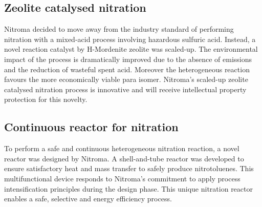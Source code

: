 \subsection{Zeolite catalysed nitration}

Nitroma decided to move away from the industry standard of performing nitration with a mixed-acid process involving hazardous sulfuric acid. Instead, a novel reaction catalyst by H-Mordenite zeolite was scaled-up. The environmental impact of the process is dramatically improved due to the absence of  emissions and the reduction of wasteful spent acid. Moreover the heterogeneous reaction favours the more economically viable para isomer. Nitroma's scaled-up zeolite catalysed nitration process is innovative and will receive intellectual property protection for this novelty. 

\subsection{Continuous reactor for nitration}

To perform a safe and continuous heterogeneous nitration reaction, a novel reactor was designed by Nitroma. A shell-and-tube reactor was developed to ensure satisfactory heat and mass transfer to safely produce nitrotoluenes. This multifunctional device responds to Nitroma's commitment to apply process intensification principles during the design phase. This unique nitration reactor enables a safe, selective and energy efficiency process.
